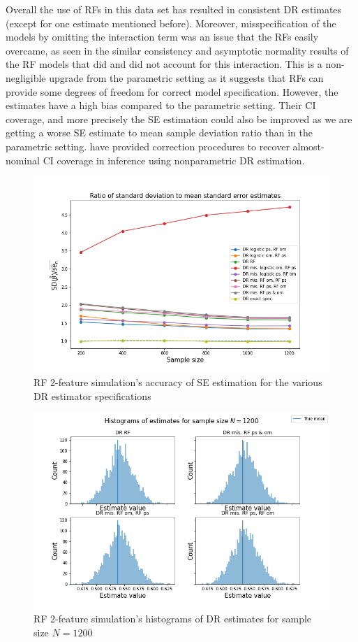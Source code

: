 \documentclass[12pt,twoside]{article}
\begin{document}
Overall the use of RFs in this data set has resulted in consistent DR estimates (except for one estimate mentioned before). Moreover, misspecification of the models by omitting the interaction term was an issue that the RFs easily overcame, as seen in the similar consistency and asymptotic normality results of the RF models that did and did not account for this interaction. This is a non-negligible upgrade from the parametric setting as it suggests that RFs can provide some degrees of freedom for correct model specification. However, the estimates have a high bias compared to the parametric setting. Their CI coverage, and more precisely the \cite{lunceford_davidian} SE estimation could also be improved as we are getting a worse SE estimate to mean sample deviation ratio than in the parametric setting. \cite{benkeser2017} have provided correction procedures to recover almost-nominal CI coverage in inference using nonparametric DR estimation.

\begin{figure}[h!]
    \centering
    \includegraphics[width = 0.9\columnwidth]{figures/SERF.png}
    \caption{RF 2-feature simulation's accuracy of \citet{lunceford_davidian} SE estimation for the various DR estimator specifications}
    \label{figSERF}
\end{figure}

\begin{figure}[h!]
    \centering
    \includegraphics[width = 0.9\columnwidth]{figures/histRF.png}
    \caption{RF 2-feature simulation's histograms of DR estimates for sample size $N = 1200$}
    \label{fighistRF}
\end{figure}
\end{document}
